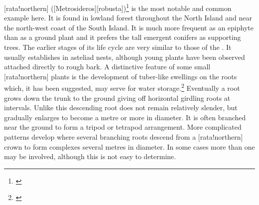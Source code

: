 [rata!northern] ([Metrosideros][robusta])\footnote{\cite{dawson1967growth}} is the most notable and common example here.
It is found in lowland forest throughout the North Island and near the north-west coast of the South Island.
It is much more frequent as an epiphyte than as a ground plant and it prefers the tall emergent conifers as supporting trees.
The earlier stages of its life cycle are very similar to those of the .
It usually establishes in asteliad nests, although young plants have been observed attached directly to rough bark.
A distinctive feature of some small [rata!northern] plants is the development of tuber-like swellings on the roots which, it has been suggested, may serve for water storage.\footnote{\cite{beddie1953root}}
Eventually a root grows down the trunk to the ground giving off horizontal girdling roots at intervals.
Unlike  this descending root does not remain relatively slender, but gradually enlarges to become a metre or more in diameter.
It is often branched near the ground to form a tripod or tetrapod arrangement.
More complicated patterns develop where several branching roots descend from a [rata!northern] crown to form complexes several metres in diameter.
In some cases more than one  may be involved, although this is not easy to determine.

